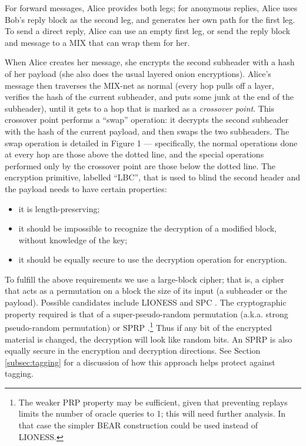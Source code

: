 \documentclass{llncs}
\begin{document}
For forward messages, Alice provides both legs; for anonymous replies, Alice
uses Bob's reply block as the second leg, and generates her own path
for the first leg.  To send a direct reply, Alice can use an empty
first leg, or send the reply block and message to a MIX that can wrap
them for her.

When Alice creates her message, she encrypts the second subheader
with a hash of her payload (she also does the usual layered onion
encryptions). Alice's message then traverses the MIX-net as normal (every
hop pulls off a layer, verifies the hash of the current subheader,
and puts some junk at the end of the subheader), until it gets to a
hop that is marked as a \emph{crossover point}. This crossover point
performs a ``swap'' operation: it decrypts the second subheader with
the hash of the current payload, and then swaps the two subheaders. The
swap operation is detailed in Figure 1 --- specifically, the normal
operations done at every hop are those above the dotted line, and the
special operations performed only by the crossover point are those below
the dotted line. The encryption primitive, labelled ``LBC'', that is
used to blind the second  header and the payload needs to have certain
properties:

\begin{itemize}
\item it is length-preserving;

\item it should be impossible to recognize the decryption of a modified
      block, without knowledge of the key;
\item it should be equally secure to use the decryption operation
      for encryption.
\end{itemize}

To fulfill the above requirements we use a large-block cipher; that
is, a cipher that acts as a permutation on a block the size of its
input (a subheader or the payload).  Possible candidates
include LIONESS \cite{BEAR-LIONESS} and SPC \cite{SPC}.
The cryptographic property required is that of a super-pseudo-random
permutation (a.k.a. strong pseudo-random permutation) or SPRP \cite{sprp}.\footnote{
The weaker PRP property may be sufficient, given that preventing
replays limits the number of oracle queries to 1; this will need
further analysis.  In that case the simpler BEAR construction
\cite{BEAR-LIONESS} could be used instead of LIONESS.}
Thus if any bit of
the encrypted material is changed, the decryption will look like random
bits.  An SPRP is also equally secure in the encryption and decryption
directions.  See Section \ref{subsec:tagging} for a
discussion of how this approach helps protect against tagging.
\end{document}
